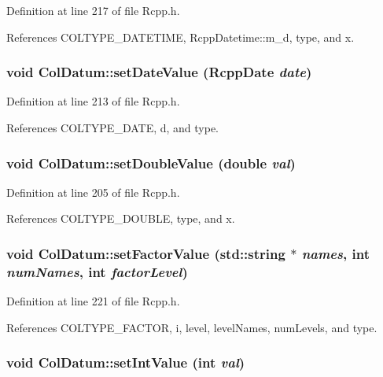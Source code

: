 Definition at line 217 of file Rcpp.h.

References COLTYPE\_\-DATETIME, RcppDatetime::m\_\-d, type, and x.\hypertarget{classColDatum_988defa165f1d5ab7cde96d2c86c7c69}{
\subsubsection[{setDateValue}]{\setlength{\rightskip}{0pt plus 5cm}void ColDatum::setDateValue ({\bf RcppDate} {\em date})}}
\label{classColDatum_988defa165f1d5ab7cde96d2c86c7c69}




Definition at line 213 of file Rcpp.h.

References COLTYPE\_\-DATE, d, and type.\hypertarget{classColDatum_edf3ac3ea399222524f02f3468ec97a0}{
\subsubsection[{setDoubleValue}]{\setlength{\rightskip}{0pt plus 5cm}void ColDatum::setDoubleValue (double {\em val})}}
\label{classColDatum_edf3ac3ea399222524f02f3468ec97a0}




Definition at line 205 of file Rcpp.h.

References COLTYPE\_\-DOUBLE, type, and x.\hypertarget{classColDatum_bd6f582044692c2215d9cd4add379ea1}{
\subsubsection[{setFactorValue}]{\setlength{\rightskip}{0pt plus 5cm}void ColDatum::setFactorValue (std::string $\ast$ {\em names}, \/  int {\em numNames}, \/  int {\em factorLevel})}}
\label{classColDatum_bd6f582044692c2215d9cd4add379ea1}




Definition at line 221 of file Rcpp.h.

References COLTYPE\_\-FACTOR, i, level, levelNames, numLevels, and type.\hypertarget{classColDatum_80d401e1efb6e714113990c78e72eb84}{
\subsubsection[{setIntValue}]{\setlength{\rightskip}{0pt plus 5cm}void ColDatum::setIntValue (int {\em val})}}
\label{classColDatum_80d401e1efb6e714113990c78e72eb84}




